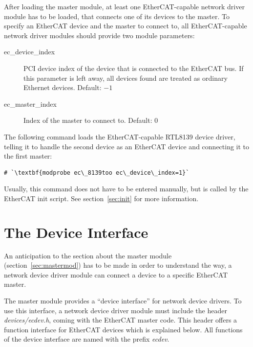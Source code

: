 \documentclass[a4paper,12pt,BCOR6mm,bibtotoc,idxtotoc]{scrbook}
\begin{document}
After loading the master module, at least one EtherCAT-capable network
driver module has to be loaded, that connects one of its devices to
the master. To specify an EtherCAT device and the master to connect
to, all EtherCAT-capable network driver modules should provide two
module parameters:

\begin{description}
\item[ec\_device\_index] PCI device index of the device that is
  connected to the EtherCAT bus. If this parameter is left away, all
  devices found are treated as ordinary Ethernet devices. Default:
  $-1$
\item[ec\_master\_index] Index of the master to connect to. Default:
  $0$
\end{description}

The following command loads the EtherCAT-capable RTL8139 device
driver, telling it to handle the second device as an EtherCAT device
and connecting it to the first master:

\begin{lstlisting}[gobble=2]
  # `\textbf{modprobe ec\_8139too ec\_device\_index=1}`
\end{lstlisting}

Usually, this command does not have to be entered manually, but is
called by the EtherCAT init script. See section~\ref{sec:init} for
more information.


\section{The Device Interface}
\label{sec:ecdev}

An anticipation to the section about the master module
(section~\ref{sec:mastermod}) has to be made in order to understand
the way, a network device driver module can connect a device to a
specific EtherCAT master.

The master module provides a ``device interface'' for network device
drivers. To use this interface, a network device driver module must
include the header
\textit{devices/ecdev.h}, coming
with the EtherCAT master code. This header offers a function interface
for EtherCAT devices which is explained below. All functions of the
device interface are named with the prefix \textit{ecdev}.
\end{document}
